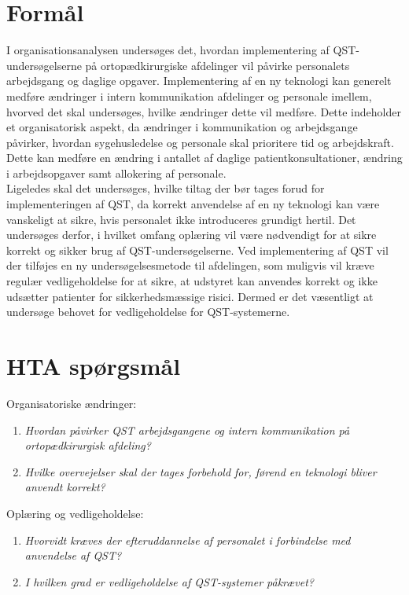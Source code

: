 \section{Formål}
I organisationsanalysen undersøges det, hvordan implementering af QST-undersøgelserne på ortopædkirurgiske afdelinger vil påvirke personalets arbejdsgang og daglige opgaver. Implementering af en ny teknologi kan generelt medføre ændringer i intern kommunikation afdelinger og personale imellem, hvorved det skal undersøges, hvilke ændringer dette vil medføre. Dette indeholder et organisatorisk aspekt, da ændringer i kommunikation og arbejdsgange påvirker, hvordan sygehusledelse og personale skal prioritere tid og arbejdskraft. Dette kan medføre en ændring i antallet af daglige patientkonsultationer, ændring i arbejdsopgaver samt allokering af personale. \\
Ligeledes skal det undersøges, hvilke tiltag der bør tages forud for implementeringen af QST, da korrekt anvendelse af en ny teknologi kan være vanskeligt at sikre, hvis personalet ikke introduceres grundigt hertil. Det undersøges derfor, i hvilket omfang oplæring vil være nødvendigt for at sikre korrekt og sikker brug af QST-undersøgelserne. Ved implementering af QST vil der tilføjes en ny undersøgelsesmetode til afdelingen, som muligvis vil kræve regulær vedligeholdelse for at sikre, at udstyret kan anvendes korrekt og ikke udsætter patienter for sikkerhedsmæssige risici. Dermed er det væsentligt at undersøge behovet for vedligeholdelse for QST-systemerne.

\section{HTA spørgsmål}
Organisatoriske ændringer:
\begin{enumerate}
	\item \textit{Hvordan påvirker QST arbejdsgangene og intern kommunikation på ortopædkirurgisk afdeling?} %
	\item \textit{Hvilke overvejelser skal der tages forbehold for, førend en teknologi bliver anvendt korrekt?} %
\end{enumerate}
Oplæring og vedligeholdelse:
\begin{enumerate}[resume]
	\item \textit{Hvorvidt kræves der efteruddannelse af personalet i forbindelse med anvendelse af QST?} %
	\item \textit{I hvilken grad er vedligeholdelse af QST-systemer påkrævet?} %
\end{enumerate}


